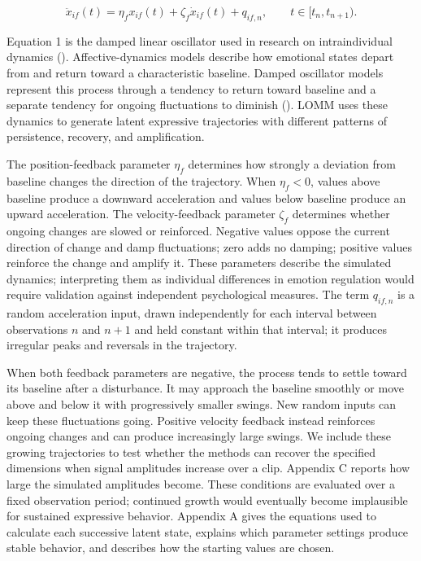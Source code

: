 \documentclass[
]{article}
\begin{document}
\begin{equation}
\ddot{x}_{if}(t)
=
\eta_f x_{if}(t)
+
\zeta_f\dot{x}_{if}(t)
+
q_{if,n},
\qquad t\in[t_n,t_{n+1}).
\label{eq:lomm-latent}
\end{equation}

Equation 1 is the damped linear oscillator used in research on
intraindividual dynamics (). Affective-dynamics models describe how emotional
states depart from and return toward a characteristic baseline. Damped
oscillator models represent this process through a tendency to return
toward baseline and a separate tendency for ongoing fluctuations to
diminish (). LOMM
uses these dynamics to generate latent expressive trajectories with
different patterns of persistence, recovery, and amplification.

The position-feedback parameter \(\eta_f\) determines how strongly a
deviation from baseline changes the direction of the trajectory. When
\(\eta_f<0\), values above baseline produce a downward acceleration and
values below baseline produce an upward acceleration. The
velocity-feedback parameter \(\zeta_f\) determines whether ongoing
changes are slowed or reinforced. Negative values oppose the current
direction of change and damp fluctuations; zero adds no damping;
positive values reinforce the change and amplify it. These parameters
describe the simulated dynamics; interpreting them as individual
differences in emotion regulation would require validation against
independent psychological measures. The term \(q_{if,n}\) is a random
acceleration input, drawn independently for each interval between
observations \(n\) and \(n+1\) and held constant within that interval;
it produces irregular peaks and reversals in the trajectory.

When both feedback parameters are negative, the process tends to settle
toward its baseline after a disturbance. It may approach the baseline
smoothly or move above and below it with progressively smaller swings.
New random inputs can keep these fluctuations going. Positive velocity
feedback instead reinforces ongoing changes and can produce increasingly
large swings. We include these growing trajectories to test whether the
methods can recover the specified dimensions when signal amplitudes
increase over a clip. Appendix C reports how large the simulated
amplitudes become. These conditions are evaluated over a fixed
observation period; continued growth would eventually become implausible
for sustained expressive behavior. Appendix A gives the equations used
to calculate each successive latent state, explains which parameter
settings produce stable behavior, and describes how the starting values
are chosen.
\end{document}
